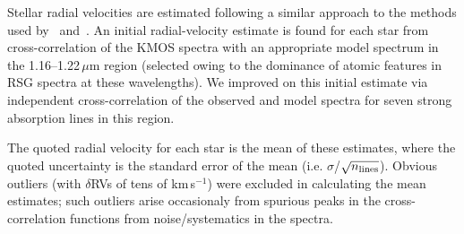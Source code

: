 \documentclass[useAMS,usenatbib]{mn2e}
\def\kms{$\mbox{km s}^{-1}$}
\begin{document}

Stellar radial velocities are estimated following a similar approach to the methods used by~\citet{2015ApJ...798...23L} and~\citet{2015ApJ...803...14P}. An initial radial-velocity estimate is found for each star from cross-correlation of the KMOS spectra with an appropriate model spectrum in the 1.16--1.22\,$\mu$m region
(selected owing to the dominance of atomic features in RSG spectra at these wavelengths).
We improved on this initial estimate via independent cross-correlation of the observed and model spectra for seven strong absorption lines in this region.

The quoted radial velocity for each star is the mean of these estimates, where the quoted uncertainty is the standard error of the mean
(i.e. $\sigma$/$\sqrt{n_{\rm lines}}$).
Obvious outliers (with $\delta$RVs of tens of km\,s$^{-1}$) were excluded in calculating the mean estimates; such outliers arise occasionaly from spurious peaks in the cross-correlation functions from noise/systematics in the spectra.



\end{document}
